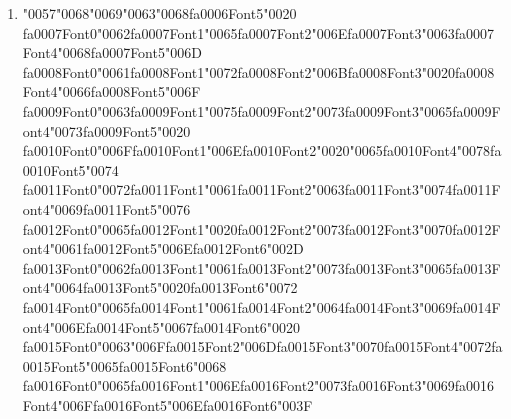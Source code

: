 \documentclass[12pt]{article}
\begin{document}
\begin{enumerate}[label=Q\arabic*.]
\item {\char"0057}{\char"0068}{\char"0069}{\char"0063}{\char"0068}{\csname fa0006Font5\endcsname\char"0020} {\csname fa0007Font0\endcsname\char"0062}{\csname fa0007Font1\endcsname\char"0065}{\csname fa0007Font2\endcsname\char"006E}{\csname fa0007Font3\endcsname\char"0063}{\csname fa0007Font4\endcsname\char"0068}{\csname fa0007Font5\endcsname\char"006D} {\csname fa0008Font0\endcsname\char"0061}{\csname fa0008Font1\endcsname\char"0072}{\csname fa0008Font2\endcsname\char"006B}{\csname fa0008Font3\endcsname\char"0020}{\csname fa0008Font4\endcsname\char"0066}{\csname fa0008Font5\endcsname\char"006F} {\csname fa0009Font0\endcsname\char"0063}{\csname fa0009Font1\endcsname\char"0075}{\csname fa0009Font2\endcsname\char"0073}{\csname fa0009Font3\endcsname\char"0065}{\csname fa0009Font4\endcsname\char"0073}{\csname fa0009Font5\endcsname\char"0020} {\csname fa0010Font0\endcsname\char"006F}{\csname fa0010Font1\endcsname\char"006E}{\csname fa0010Font2\endcsname\char"0020}{\char"0065}{\csname fa0010Font4\endcsname\char"0078}{\csname fa0010Font5\endcsname\char"0074} {\csname fa0011Font0\endcsname\char"0072}{\csname fa0011Font1\endcsname\char"0061}{\csname fa0011Font2\endcsname\char"0063}{\csname fa0011Font3\endcsname\char"0074}{\csname fa0011Font4\endcsname\char"0069}{\csname fa0011Font5\endcsname\char"0076} {\csname fa0012Font0\endcsname\char"0065}{\csname fa0012Font1\endcsname\char"0020}{\csname fa0012Font2\endcsname\char"0073}{\csname fa0012Font3\endcsname\char"0070}{\csname fa0012Font4\endcsname\char"0061}{\csname fa0012Font5\endcsname\char"006E}{\csname fa0012Font6\endcsname\char"002D} {\csname fa0013Font0\endcsname\char"0062}{\csname fa0013Font1\endcsname\char"0061}{\csname fa0013Font2\endcsname\char"0073}{\csname fa0013Font3\endcsname\char"0065}{\csname fa0013Font4\endcsname\char"0064}{\csname fa0013Font5\endcsname\char"0020}{\csname fa0013Font6\endcsname\char"0072} {\csname fa0014Font0\endcsname\char"0065}{\csname fa0014Font1\endcsname\char"0061}{\csname fa0014Font2\endcsname\char"0064}{\csname fa0014Font3\endcsname\char"0069}{\csname fa0014Font4\endcsname\char"006E}{\csname fa0014Font5\endcsname\char"0067}{\csname fa0014Font6\endcsname\char"0020} {\csname fa0015Font0\endcsname\char"0063}{\char"006F}{\csname fa0015Font2\endcsname\char"006D}{\csname fa0015Font3\endcsname\char"0070}{\csname fa0015Font4\endcsname\char"0072}{\csname fa0015Font5\endcsname\char"0065}{\csname fa0015Font6\endcsname\char"0068} {\csname fa0016Font0\endcsname\char"0065}{\csname fa0016Font1\endcsname\char"006E}{\csname fa0016Font2\endcsname\char"0073}{\csname fa0016Font3\endcsname\char"0069}{\csname fa0016Font4\endcsname\char"006F}{\csname fa0016Font5\endcsname\char"006E}{\csname fa0016Font6\endcsname\char"003F}

\end{enumerate}
\end{document}
